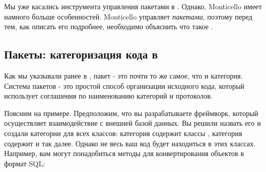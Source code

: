 \documentclass[a4paper,10pt,twoside]{book}
\begin{document}

Мы уже касались инструмента управления пакетами  в . Однако, Monticello имеет намного больше особенностей. Monticello управляет \emph{пакетами}, поэтому перед тем, как описать его подробнее, необходимо объяснить что такое .

\subsection{Пакеты: категоризация кода в \pharo}


Как мы указывали ранее в , пакет - это почти то же самое, что и категория. Система пакетов - это простой способ организации исходного кода, который использует соглашения по наименованию категорий и протоколов.


Поясним на примере. Предположим, что вы разрабатываете фреймворк, который осуществляет взаимодействие с внешней базой данных. Вы решили назвать его  и создали категории для всех классов: категория  содержит классы , категория  содержит  и так далее. Однако не весь ваш код будет находиться в этих классах. Например, вам могут понадобиться методы для конвертирования объектов в формат SQL:
\end{document}
